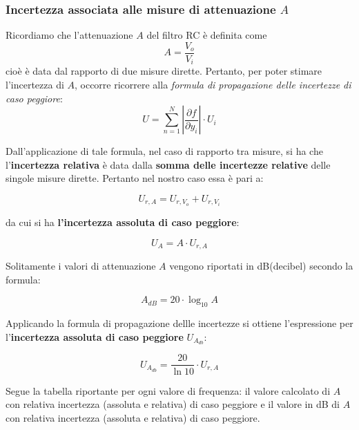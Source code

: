 \subsubsection*{Incertezza associata alle misure di attenuazione $A$}

Ricordiamo che l'attenuazione $A$ del filtro RC è definita come
\[A = \frac{V_o}{V_i}\]
cioè è data dal rapporto di due misure dirette. Pertanto, per poter stimare l'incertezza di $A$, occorre ricorrere alla \textit{formula di propagazione delle incertezze di caso peggiore}:
\[U = \sum_{n=1}^{N} \left|\frac{\partial f}{\partial y_i}\right| \cdot U_i\]

Dall'applicazione di tale formula, nel caso di rapporto tra misure, si ha che l'\textbf{incertezza relativa} è data dalla \textbf{somma delle incertezze relative} delle singole misure dirette. Pertanto nel nostro caso essa è pari a:

\[U_{r,A} = U_{r,V_o} + U_{r,V_i}\]

da cui si ha\textbf{ l'incertezza assoluta di caso peggiore}:

\[U_A = A \cdot U_{r,A}\]

Solitamente i valori di attenuazione $A$ vengono riportati in dB(decibel) secondo la formula:

\[A_{dB} = 20\cdot \log_{10} A\]

Applicando la formula di propagazione dellle incertezze si ottiene l'espressione per l'\textbf{incertezza assoluta di caso peggiore} $U_{A_{db}}$:

\[U_{A_{db}} = \frac{20}{\ln 10} \cdot U_{r,A}\]

Segue la tabella riportante per ogni valore di frequenza: il valore calcolato di $A$ con relativa incertezza (assoluta e relativa) di caso peggiore e il valore in dB di $A$ con relativa incertezza (assoluta e relativa) di caso peggiore.

